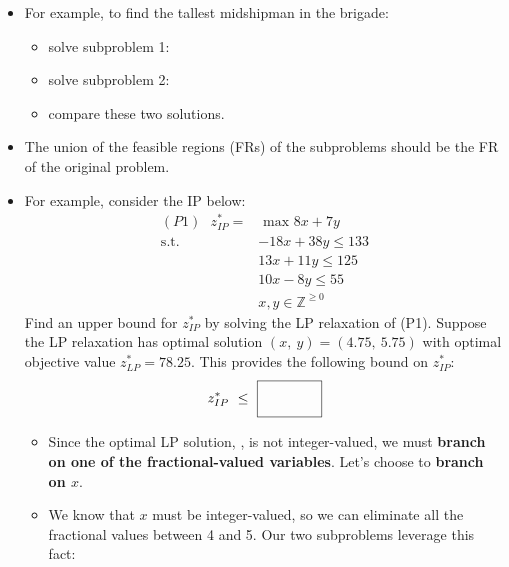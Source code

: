 \documentclass[11pt]{article}
\theoremstyle{definition}
\newcommand{\answerbox}[3]{%
  \fbox{%
    \begin{minipage}[#1]{#2}
      \hfill\vspace{#3}
    \end{minipage}
  }
}
\newcommand{\wordbox}{\answerbox{c}{1.2in}{.7cm}}
\newcommand{\catbox}{\answerbox{c}{.5in}{.7cm}}
\begin{document}
\begin{itemize}
\item For example, to find the tallest midshipman in the brigade:
\begin{itemize}
\item solve subproblem 1:  \answerbox{c}{10cm}{.7cm}
\item solve subproblem 2:  \answerbox{c}{10cm}{.7cm}
\item compare these two solutions.
\end{itemize}

\item  The union of the feasible regions (FRs) of the subproblems should be \wordbox the FR of the original problem.
\item For example, consider the IP below:
    \begin{align*}
    (P1) ~~~ z_{IP}^* = & \text{ max } 8x + 7y\\
      \text{s.t.} \quad & -18x + 38y \leq 133\\
                       & 13x + 11y \leq 125\\
                       & 10x -    8y \leq 55\\
                       & x, y \in \mathbb{Z}^{\geq 0}
    \end{align*}
Find an upper bound for $z_{IP}^*$ by solving the LP relaxation of (P1).  Suppose the LP relaxation has optimal solution $(x, ~y) =  (4.75, ~5.75)$ with optimal objective value $z^*_{LP} = 78.25$.  This provides the following bound on $z_{IP}^*$:
\[ z^*_{IP} ~\leq~ \catbox \]

\bigskip
\begin{itemize}
	\item Since the optimal LP solution, \underline{\hspace{3cm}}, is not integer-valued, we must \textbf{branch on one of the fractional-valued variables}.  Let's choose to \textbf{branch on $x$}.
 	\item  We know that $x$ must be integer-valued, so we can eliminate all the fractional values between 4 and 5.  Our two subproblems leverage this fact:
\end{itemize}


\end{itemize}
\end{document}
